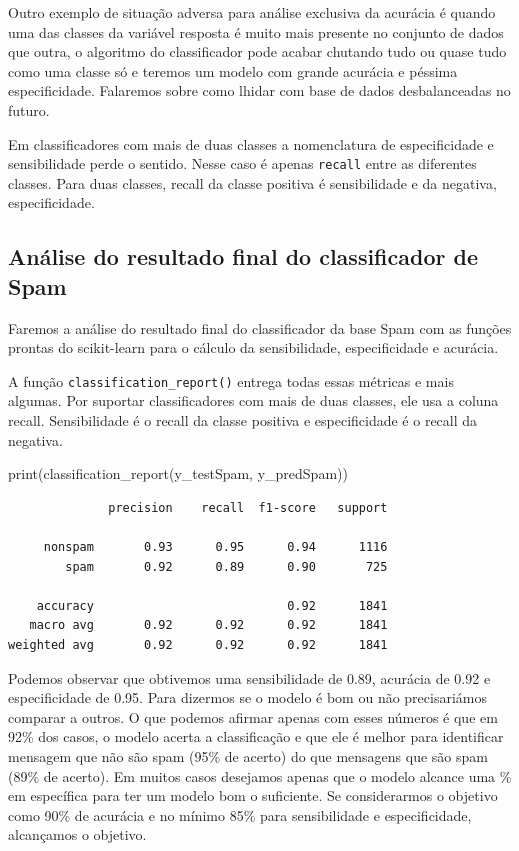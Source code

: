 \documentclass[
  letterpaper,
  DIV=11,
  numbers=noendperiod]{scrreprt}
\newenvironment{Shaded}{\begin{snugshade}}{\end{snugshade}}
\newcommand{\BuiltInTok}[1]{\textcolor[rgb]{0.00,0.23,0.31}{#1}}
\newcommand{\NormalTok}[1]{\textcolor[rgb]{0.00,0.23,0.31}{#1}}
\begin{document}
Outro exemplo de situação adversa para análise exclusiva da acurácia é
quando uma das classes da variável resposta é muito mais presente no
conjunto de dados que outra, o algoritmo do classificador pode acabar
chutando tudo ou quase tudo como uma classe só e teremos um modelo com
grande acurácia e péssima especificidade. Falaremos sobre como lhidar
com base de dados desbalanceadas no futuro.

Em classificadores com mais de duas classes a nomenclatura de
especificidade e sensibilidade perde o sentido. Nesse caso é apenas
\texttt{recall} entre as diferentes classes. Para duas classes, recall
da classe positiva é sensibilidade e da negativa, especificidade.

\hypertarget{anuxe1lise-do-resultado-final-do-classificador-de-spam}{%
\subsection{Análise do resultado final do classificador de
Spam}\label{anuxe1lise-do-resultado-final-do-classificador-de-spam}}

Faremos a análise do resultado final do classificador da base Spam com
as funções prontas do scikit-learn para o cálculo da sensibilidade,
especificidade e acurácia.

A função \texttt{classification\_report()} entrega todas essas métricas
e mais algumas. Por suportar classificadores com mais de duas classes,
ele usa a coluna recall. Sensibilidade é o recall da classe positiva e
especificidade é o recall da negativa.

\begin{Shaded}
\begin{Highlighting}[]
\BuiltInTok{print}\NormalTok{(classification\_report(y\_testSpam, y\_predSpam))}
\end{Highlighting}
\end{Shaded}

\begin{verbatim}
              precision    recall  f1-score   support

     nonspam       0.93      0.95      0.94      1116
        spam       0.92      0.89      0.90       725

    accuracy                           0.92      1841
   macro avg       0.92      0.92      0.92      1841
weighted avg       0.92      0.92      0.92      1841
\end{verbatim}

Podemos observar que obtivemos uma sensibilidade de 0.89, acurácia de
0.92 e especificidade de 0.95. Para dizermos se o modelo é bom ou não
precisariámos comparar a outros. O que podemos afirmar apenas com esses
números é que em 92\% dos casos, o modelo acerta a classificação e que
ele é melhor para identificar mensagem que não são spam (95\% de acerto)
do que mensagens que são spam (89\% de acerto). Em muitos casos
desejamos apenas que o modelo alcance uma \% em específica para ter um
modelo bom o suficiente. Se considerarmos o objetivo como 90\% de
acurácia e no mínimo 85\% para sensibilidade e especificidade,
alcançamos o objetivo.
\end{document}
